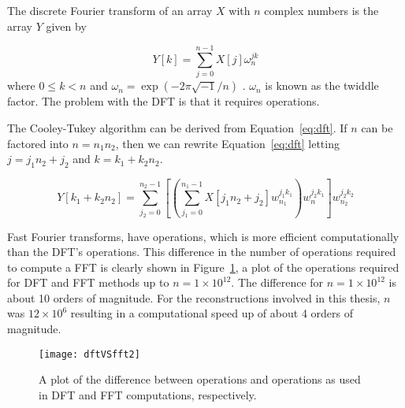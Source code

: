         The discrete Fourier transform of an array $X$ with $n$ complex numbers is the array
        $Y$ given by

        \begin{equation}
            Y[k] = \sum_{j=0}^{n-1}X[j]\omega_n^{jk}
            \label{eq:dft}
        \end{equation}
        where $0\le k < n$ and $\omega_n=\exp\left( -2\pi\sqrt{-1}/n \right)$
        \cite{frigo2005design}.
        $\omega_n$ is known as the twiddle factor. The problem
        with the DFT is that it requires  operations.

        The Cooley-Tukey algorithm can be derived from Equation~\ref{eq:dft}. If
        $n$ can be factored into $n=n_1n_2$, then we can rewrite
        Equation~\ref{eq:dft}
        letting $j=j_1n_2+j_2$ and $k=k_1+k_2n_2$.

        \begin{equation}
            Y[k_1+k_2n_2]=\sum_{j_2=0}^{n_2-1}\left[ \left( \sum_{j_1=0}^{n_1-1}
                X[j_1n_2+j_2]w_{n_1}^{j_1k_1} \right)w_n^{j_2k_1} \right]w_{n_2}^{j_2k_2}
            \end{equation}


            Fast Fourier transforms,
            have  operations, which is more efficient
            computationally than the DFT's  operations. This
            difference in the number of operations required to compute a FFT is clearly shown in
            Figure~\ref{fig:dftVSfft}, a plot of the operations required for
            DFT and FFT methods up to $n=1\times 10^{12}$.
            The difference for $n=1\times 10^{12}$ is about 10 orders of
            magnitude. For the reconstructions involved in this thesis, $n$ was
            $12\times 10^{6}$ resulting in a computational speed up of about 4
            orders of magnitude.

            \begin{figure}[htbp!]
                \begin{center}
                    \texttt{[image: dftVSfft2]}
                \end{center}
                \caption{A plot of the difference between  operations and
                 operations as used in DFT and FFT computations,
            respectively.}
                \label{fig:dftVSfft}
            \end{figure}


